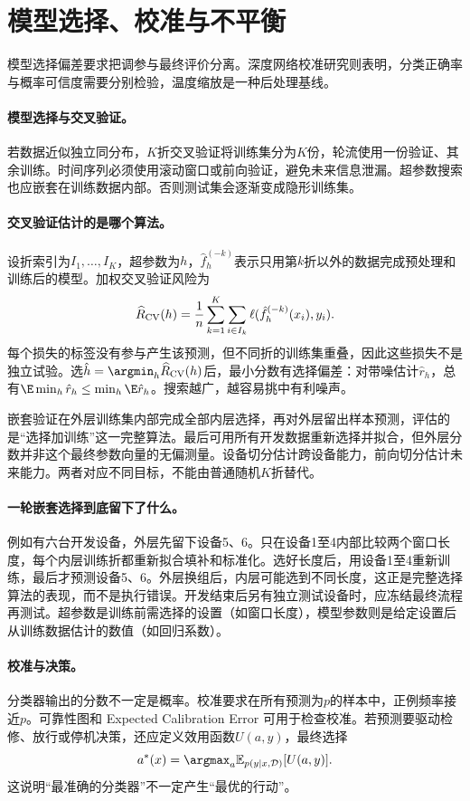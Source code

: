 \section{模型选择、校准与不平衡}
模型选择偏差要求把调参与最终评价分离\cite{cawley2010selection}。深度网络校准研究则表明，分类正确率与概率可信度需要分别检验，温度缩放是一种后处理基线\cite{guo2017calibration}。
\paragraph{模型选择与交叉验证。}
若数据近似独立同分布，$K$折交叉验证将训练集分为$K$份，轮流使用一份验证、其余训练。时间序列必须使用滚动窗口或前向验证，避免未来信息泄漏。超参数搜索也应嵌套在训练数据内部。否则测试集会逐渐变成隐形训练集。

\paragraph{交叉验证估计的是哪个算法。}
设折索引为$I_1,\ldots,I_K$，超参数为$h$，$\hat f_h^{(-k)}$表示只用第$k$折以外的数据完成预处理和训练后的模型。加权交叉验证风险为
\begin{equation}
 \widehat R_{\rm CV}(h)=\frac1n\sum_{k=1}^K\sum_{i\in I_k}
 \ell(\hat f_h^{(-k)}(x_i),y_i).
\end{equation}
每个损失的标签没有参与产生该预测，但不同折的训练集重叠，因此这些损失不是独立试验。选$\hat h=\argmin_h\widehat R_{\rm CV}(h)$后，最小分数有选择偏差：对带噪估计$\hat r_h$，总有$\E\min_h\hat r_h\leq\min_h\E\hat r_h$。搜索越广，越容易挑中有利噪声。

嵌套验证在外层训练集内部完成全部内层选择，再对外层留出样本预测，评估的是“选择加训练”这一完整算法。最后可用所有开发数据重新选择并拟合，但外层分数并非这个最终参数向量的无偏测量。设备切分估计跨设备能力，前向切分估计未来能力。两者对应不同目标，不能由普通随机$K$折替代。

\paragraph{一轮嵌套选择到底留下了什么。}
例如有六台开发设备，外层先留下设备5、6。只在设备1至4内部比较两个窗口长度，每个内层训练折都重新拟合填补和标准化。选好长度后，用设备1至4重新训练，最后才预测设备5、6。外层换组后，内层可能选到不同长度，这正是完整选择算法的表现，而不是执行错误。开发结束后另有独立测试设备时，应冻结最终流程再测试。超参数是训练前需选择的设置（如窗口长度），模型参数则是给定设置后从训练数据估计的数值（如回归系数）。

\paragraph{校准与决策。}
分类器输出的分数不一定是概率。校准要求在所有预测为$p$的样本中，正例频率接近$p$。可靠性图和 Expected Calibration Error 可用于检查校准。若预测要驱动检修、放行或停机决策，还应定义效用函数$U(a,y)$，最终选择
\begin{equation}
 a^*(x)=\argmax_a\mathbb{E}_{p(y\mid x,\mathcal{D})}[U(a,y)].
\end{equation}
这说明“最准确的分类器”不一定产生“最优的行动”。

